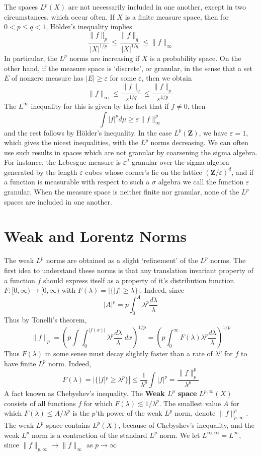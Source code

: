 The spaces $L^p(X)$ are not necessarily included in one another, except in two circumstances, which occur often. If $X$ is a finite measure space, then for $0 < p \leq q < 1$, H\"{o}lder's inequality implies
%
\[ \frac{\|f\|_p}{|X|^{1/p}} \leq \frac{\|f\|_q}{|X|^{1/q}} \leq \| f \|_\infty \]
%
In particular, the $L^p$ norms are increasing if $X$ is a probability space. On the other hand, if the measure space is `discrete', or granular, in the sense that a set $E$ of nonzero measure has $|E| \geq \varepsilon$ for some $\varepsilon$, then we obtain
%
\[ \| f \|_\infty \leq \frac{\| f \|_q}{\varepsilon^{1/q}} \leq \frac{\| f \|_p}{\varepsilon^{1/p}} \]
%
The $L^\infty$ inequality for this is given by the fact that if $f \neq 0$, then
%
\[ \int |f|^p d\mu \geq \varepsilon \| f \|_\infty^p \]
%
and the rest follows by H\"{o}lder's inequality. In the case $L^p(\mathbf{Z})$, we have $\varepsilon = 1$, which gives the nicest inequalities, with the $L^p$ norms decreasing. We can often use such results in spaces which are not granular by coarsening the sigma algebra. For instance, the Lebesgue measure is $\varepsilon^d$ granular over the sigma algebra generated by the length $\varepsilon$ cubes whose corner's lie on the lattice $(\mathbf{Z}/\varepsilon)^d$, and if a function is measurable with respect to such a $\sigma$ algebra we call the function $\varepsilon$ granular. When the measure space is neither finite nor granular, none of the $L^p$ spaces are included in one another.

\section{Weak and Lorentz Norms}

The weak $L^p$ norms are obtained as a slight `refinement' of the $L^p$ norms. The first idea to understand these norms is that any translation invariant property of a function $f$ should express itself as a property of it's distribution function $F: [0,\infty) \to [0,\infty)$ with $F(\lambda) = |\{ |f| \geq \lambda \}|$. Indeed, since
%
\[ |A|^p = p \int_0^A \lambda^p \frac{d\lambda}{\lambda} \]
%
Thus by Tonelli's theorem,
%
\[ \| f \|_p = \left( p \int \int_0^{|f(x)|} \lambda^p \frac{d\lambda}{\lambda}\; dx \right)^{1/p} = \left( p \int_0^\infty F(\lambda) \lambda^p \frac{d\lambda}{\lambda} \right)^{1/p} \]
%
Thus $F(\lambda)$ in some sense must decay slightly faster than a rate of $\lambda^p$ for $f$ to have finite $L^p$ norm. Indeed,
%
\[ F(\lambda) = |\{ |f|^p \geq \lambda^p \}| \leq \frac{1}{\lambda^p} \int |f|^p = \frac{\| f \|_p^p}{\lambda^p} \]
%
A fact known as Chebyshev's inequality. The {\bf Weak $L^p$ space} $L^{p,\infty}(X)$ consists of all functions $f$ for which $F(\lambda) \lesssim 1/\lambda^p$. The smallest value $A$ for which $F(\lambda) \leq A/\lambda^p$ is the $p$'th power of the weak $L^p$ norm, denote $\| f \|_{p,\infty}^p$. The weak $L^p$ space contains $L^p(X)$, because of Chebyshev's inequality, and the weak $L^p$ norm is a contraction of the standard $L^p$ norm. We let $L^{\infty,\infty} = L^\infty$, since $\| f \|_{p,\infty} \to \| f \|_\infty$ as $p \to \infty$

